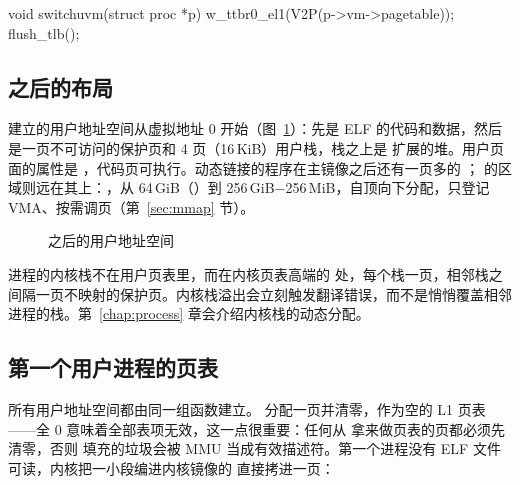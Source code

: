 \begin{ccode}
void switchuvm(struct proc *p) {
  w_ttbr0_el1(V2P(p->vm->pagetable));
  flush_tlb();
}
\end{ccode}

\subsection{ 之后的布局}

 建立的用户地址空间从虚拟地址 0 开始（图~\ref{fig:uas}）：先是 ELF 的代码和数据，然后是一页不可访问的保护页和 4 页（16\,KiB）用户栈，栈之上是  扩展的堆。用户页面的属性是 ，代码页可执行。动态链接的程序在主镜像之后还有一页多的 ； 的区域则远在其上：\code{[MMAP\_MIN, MMAP\_TOP)}，从 64\,GiB（）到 256\,GiB$-$256\,MiB，自顶向下分配，只登记 VMA、按需调页（第~\ref{sec:mmap} 节）。

\begin{figure}[htbp]
  \centering
  \caption{ 之后的用户地址空间}
  \label{fig:uas}
\end{figure}

进程的内核栈不在用户页表里，而在内核页表高端的  处，每个栈一页，相邻栈之间隔一页不映射的保护页。内核栈溢出会立刻触发翻译错误，而不是悄悄覆盖相邻进程的栈。第~\ref{chap:process} 章会介绍内核栈的动态分配。

\subsection{第一个用户进程的页表}

所有用户地址空间都由同一组函数建立。 分配一页并清零，作为空的 L1 页表——全 0 意味着全部表项无效，这一点很重要：任何从  拿来做页表的页都必须先清零，否则  填充的垃圾会被 MMU 当成有效描述符。第一个进程没有 ELF 文件可读，内核把一小段编进内核镜像的  直接拷进一页：

